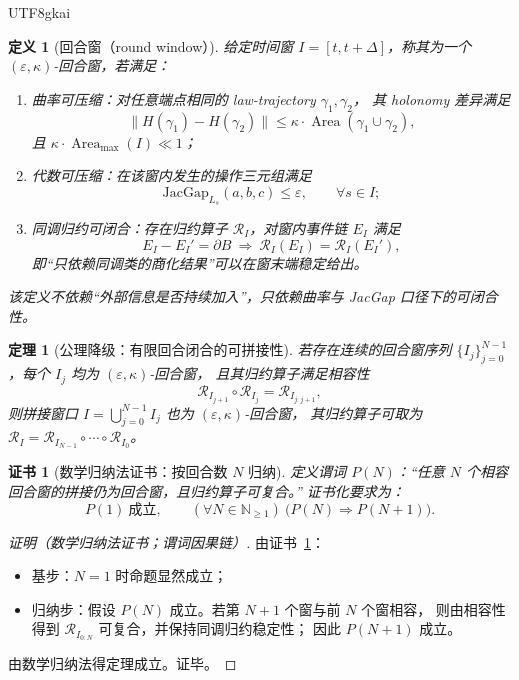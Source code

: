 \documentclass[12pt]{article}
\newtheorem{definition}{定义}[section]
\newtheorem{theorem}{定理}[section]
\newtheorem{Certificate}{证书}[section]
\newcommand{\NN}{\mathbb{N}}
\newcommand{\JacGap}{\ensuremath{\mathrm{JacGap}}} %
\begin{document}
\begin{CJK*}{UTF8}{gkai}
\begin{definition}[回合窗（round window）]
\label{def:round-window}
给定时间窗 $I=[t,t+\Delta]$，称其为一个 $(\varepsilon,\kappa)$-回合窗，若满足：
\begin{enumerate}
  \item 曲率可压缩：对任意端点相同的 law-trajectory $\gamma_1,\gamma_2$，
  其 holonomy 差异满足
  \[
    \|H(\gamma_1)-H(\gamma_2)\|
    \le \kappa\cdot \operatorname{Area}(\gamma_1\cup\gamma_2),
  \]
  且 $\kappa\cdot \operatorname{Area}_{\max}(I)\ll 1$；
  \item 代数可压缩：在该窗内发生的操作三元组满足
  \[
    \JacGap_{L_s}(a,b,c)\le \varepsilon,\qquad \forall s\in I;
  \]
  \item 同调归约可闭合：存在归约算子 $\mathcal{R}_I$，对窗内事件链 $E_I$ 满足
  \[
    E_I-E_I'=\partial B\ \Rightarrow\ \mathcal{R}_I(E_I)=\mathcal{R}_I(E_I'),
  \]
  即“只依赖同调类的商化结果”可以在窗末端稳定给出。
\end{enumerate}
该定义不依赖“外部信息是否持续加入”，只依赖曲率与 JacGap 口径下的可闭合性。
\end{definition}

\begin{theorem}[公理降级：有限回合闭合的可拼接性]
\label{thm:round-window-concatenation}
若存在连续的回合窗序列 $\{I_j\}_{j=0}^{N-1}$，每个 $I_j$ 均为 $(\varepsilon,\kappa)$-回合窗，
且其归约算子满足相容性
\[
  \mathcal{R}_{I_{j+1}}\circ \mathcal{R}_{I_j}=\mathcal{R}_{I_{j:j+1}},
\]
则拼接窗口 $I=\bigcup_{j=0}^{N-1} I_j$ 也为 $(\varepsilon,\kappa)$-回合窗，
其归约算子可取为 $\mathcal{R}_I=\mathcal{R}_{I_{N-1}}\circ\cdots\circ\mathcal{R}_{I_0}$。
\end{theorem}

\begin{Certificate}[数学归纳法证书：按回合数 $N$ 归纳]
\label{cert:round-window-concatenation}
定义谓词 $P(N)$：“任意 $N$ 个相容回合窗的拼接仍为回合窗，且归约算子可复合。”
证书化要求为：
\[
  P(1)\ \text{成立},\qquad
  (\forall N\in\NN_{\ge 1})\ \bigl(P(N)\Rightarrow P(N+1)\bigr).
\]
\end{Certificate}

\begin{proof}[证明（数学归纳法证书；谓词因果链）]
由证书~\ref{cert:round-window-concatenation}：
\begin{itemize}
  \item 基步：$N=1$ 时命题显然成立；
  \item 归纳步：假设 $P(N)$ 成立。若第 $N+1$ 个窗与前 $N$ 个窗相容，
  则由相容性得到 $\mathcal{R}_{I_{0:N}}$ 可复合，并保持同调归约稳定性；
  因此 $P(N+1)$ 成立。
\end{itemize}
由数学归纳法得定理成立。证毕。
\end{proof}


\end{CJK*}
\end{document}
